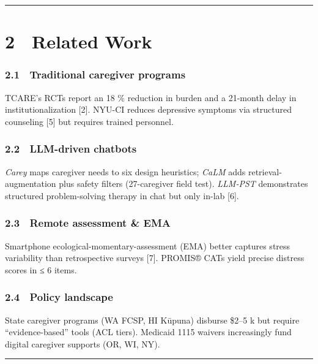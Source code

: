 \documentclass[
]{article}
\begin{document}
\begin{center}\rule{0.5\linewidth}{0.5pt}\end{center}

\section{2 Related Work}\label{related-work}

\subsubsection{2.1 Traditional caregiver
programs}\label{traditional-caregiver-programs}

TCARE's RCTs report an 18 \% reduction in burden and a 21-month delay in
institutionalization {[}2{]}. NYU-CI reduces depressive symptoms via
structured counseling {[}5{]} but requires trained personnel.

\subsubsection{2.2 LLM-driven chatbots}\label{llm-driven-chatbots}

\emph{Carey} maps caregiver needs to six design heuristics; \emph{CaLM}
adds retrieval-augmentation plus safety filters (27-caregiver field
test). \emph{LLM-PST} demonstrates structured problem-solving therapy in
chat but only in-lab {[}6{]}.

\subsubsection{2.3 Remote assessment \&
EMA}\label{remote-assessment-ema}

Smartphone ecological-momentary-assessment (EMA) better captures stress
variability than retrospective surveys {[}7{]}. PROMIS® CATs yield
precise distress scores in ≤ 6 items.

\subsubsection{2.4 Policy landscape}\label{policy-landscape}

State caregiver programs (WA FCSP, HI Kūpuna) disburse \$2--5 k but
require ``evidence-based'' tools (ACL tiers). Medicaid 1115 waivers
increasingly fund digital caregiver supports (OR, WI, NY).

\begin{center}\rule{0.5\linewidth}{0.5pt}\end{center}
\end{document}
